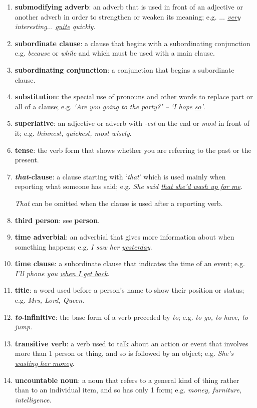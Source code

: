 \documentclass[oneside]{book}
\numberwithin{equation}{section}
\begin{document}
\begin{enumerate}
    The subjunctive is not very common in English, and is used mainly in conditional clauses e.g. \textit{If I were you$\ldots$}
    \item \textbf{submodifying adverb}: an adverb that is used in front of an adjective or another adverb in order to strengthen or weaken its meaning; e.g. \textit{$\ldots$ \underline{very} interesting$\ldots$ \underline{quite} quickly}.
    \item \textbf{subordinate clause}: a clause that begins with a subordinating conjunction e.g. \textit{because} or \textit{while} and which must be used with a main clause.
    \item \textbf{subordinating conjunction}: a conjunction that begins a subordinate clause.
    \item \textbf{substitution}: the special use of pronouns and other words to replace part or all of a clause; e.g. \textit{`Are you going to the party?' -- `I hope \underline{so}'}.
    \item \textbf{superlative}: an adjective or adverb with \textit{-est} on the end or \textit{most} in front of it; e.g. \textit{thinnest, quickest, most wisely}.
    \item \textbf{tense}: the verb form that shows whether you are referring to the past or the present.
    \item \textbf{\textit{that}-clause}: a clause starting with `\textit{that}' which is used mainly when reporting what someone has said; e.g. \textit{She said \underline{that she'd wash up for me}}.
    
    \textit{That} can be omitted when the clause is used after a reporting verb.
    \item \textbf{third person}: see \textbf{person}.
    \item \textbf{time adverbial}: an adverbial that gives more information about when something happens; e.g. \textit{I saw her \underline{yesterday}}.
    \item \textbf{time clause}: a subordinate clause that indicates the time of an event; e.g. \textit{I'll phone you \underline{when I get back}}.
    \item \textbf{title}: a word used before a person's name to show their position or status; e.g. \textit{Mrs, Lord, Queen}.
    \item \textbf{\textit{to}-infinitive}: the base form of a verb preceded by \textit{to}; e.g. \textit{to go, to have, to jump}.
    \item \textbf{transitive verb}: a verb used to talk about an action or event that involves more than 1 person or thing, and so is followed by an object; e.g. \textit{She's \underline{wasting her money}}.
    \item \textbf{uncountable noun}: a noun that refers to a general kind of thing rather than to an individual item, and so has only 1 form; e.g. \textit{money, furniture, intelligence}.
    

\end{enumerate}
\end{document}
